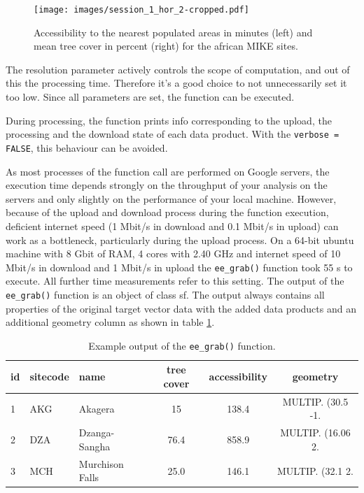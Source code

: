 \begin{center}
	\begin{figure}
		\begin{center}
			\texttt{[image: images/session\_1\_hor\_2-cropped.pdf]}
			\caption{Accessibility to the nearest populated areas in minutes (left) and mean tree cover in percent (right) for the african MIKE sites.}
			\label{sample_session_1}
		\end{center}
	\end{figure}
\end{center}

The resolution parameter actively controls the scope of computation, and out of this the processing time. Therefore it's a good choice to not unnecessarily set it too low. 
Since all parameters are set, the function can be executed. 



During processing, the function prints info corresponding to the upload, the processing and the download state of each data product. With the \texttt{verbose = FALSE}, this behaviour can be avoided. 





As most processes of the function call are performed on Google servers, the execution time depends strongly on the throughput of your analysis on the servers and only slightly on the performance of your local machine. However, because of the upload and download process during the function execution, deficient internet speed (1 Mbit/s in download and 0.1 Mbit/s in upload) can work as a bottleneck, particularly during the upload process. 
On a 64-bit ubuntu machine with 8 Gbit of RAM, 4 cores with 2.40 GHz and internet speed of 10 Mbit/s in download and 1 Mbit/s in upload the \texttt{ee\_grab()} function took 55 s to execute. All further time measurements refer to this setting.
The output of the \texttt{ee\_grab()} function is an object of class sf.  The output always contains all properties of the original target vector data with the added data products and an additional geometry column as shown in table \ref{output}.

\begin{table}[h]
	\captionsetup{justification=raggedright,
		singlelinecheck=false
	}
	\caption{Example output of the \texttt{ee\_grab()} function.}
	\begin{tabularx}{\textwidth}{lllccc}
		\toprule
		id & sitecode & name & tree cover & accessibility & geometry \\
		\midrule
		1  & AKG  & Akagera & 15 & 138.4 & MULTIP. (30.5 -1.\\
		2 & DZA  & Dzanga-Sangha & 76.4 & 858.9 & MULTIP. (16.06 2.\\
		3 & MCH  & Murchison Falls & 25.0 & 146.1 & MULTIP. (32.1 2.\\
		\bottomrule
	\end{tabularx}

	\label{output}
\end{table}



